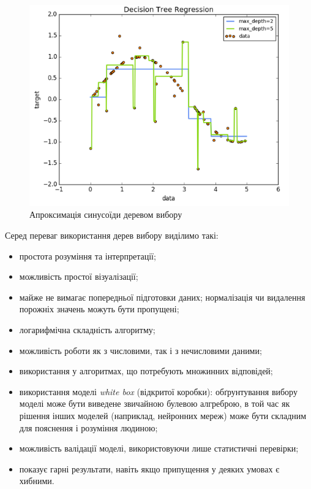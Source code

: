 \begin{figure}[h!]
  \includegraphics[width=\linewidth]{figures/decision_trees.png}
  \caption{Апроксимація синусоїди деревом вибору}
  \label{fig:decision_trees}
\end{figure}

Серед переваг використання дерев вибору виділимо такі:
\begin{itemize}  
	\item простота розуміння та інтерпретації;
	\item можливість простої візуалізації;
	\item майже не вимагає попередньої підготовки даних; нормалізація чи видалення порожніх значень можуть бути пропущені;
	\item логарифмічна складність алгоритму;
	\item можливість роботи як з числовими, так і з нечисловими даними;
	\item використання у алгоритмах, що потребують множинних відповідей;
	\item використання моделі \textit{white box} (відкритої коробки): обґрунтування вибору моделі може бути виведене звичайною булевою алгреброю, в той час як рішення інших моделей (наприклад, нейронних мереж) може бути складним для пояснення і розуміння людиною;
	\item можливість валідації моделі, використовуючи лише статистичні перевірки;
	\item показує гарні результати, навіть якщо припущення у деяких умовах є хибними.
\end{itemize}

